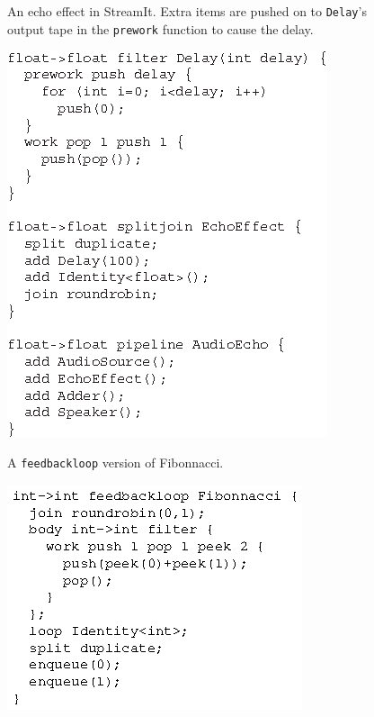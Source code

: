 \documentclass[final]{ijpp}
\begin{document}
\clearpage
\begin{figure}
  \caption{An echo effect in StreamIt.  Extra items are pushed on to
  \texttt{Delay}'s output tape in the \texttt{prework} function to
  cause the delay.}
  \label{fig:echo}
\end{figure}
\clearpage
\begin{figure}
  \includegraphics{echo.eps}
\end{figure}

\clearpage
\begin{figure}
  \caption{A \texttt{feedbackloop} version of Fibonnacci.}
\label{fig:feed}
\end{figure}
\clearpage
\begin{figure}
  \includegraphics{fib-streamit.eps}
\end{figure}
\end{document}
